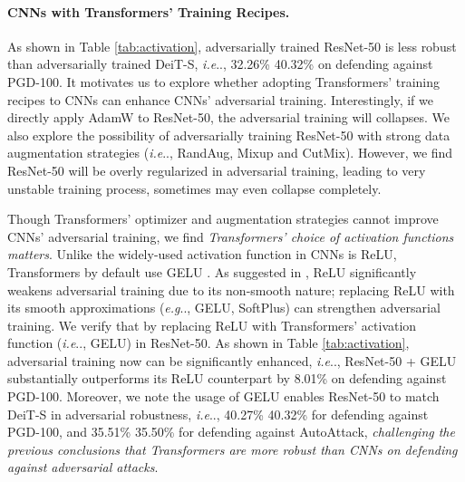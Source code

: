 \documentclass{article}
\makeatletter
\def\vs{{\bm{s}}}
\DeclareRobustCommand\onedot{\futurelet\@let@token\@onedot}
\def\@onedot{\ifx\@let@token.\else.\null\fi\xspace}
\def\eg{\emph{e.g}\onedot} \def\Eg{\emph{E.g}\onedot}
\def\ie{\emph{i.e}\onedot} \def\Ie{\emph{I.e}\onedot}
\makeatother
\begin{document}
\paragraph{CNNs with Transformers' Training Recipes.}
As shown in Table \ref{tab:activation}, adversarially trained ResNet-50 is less robust than adversarially trained DeiT-S, \ie, 32.26\% \vs 40.32\% on defending against PGD-100. It motivates us to explore whether adopting Transformers' training recipes to CNNs can enhance CNNs' adversarial training.  Interestingly, if we directly apply AdamW to ResNet-50, the adversarial training will collapses. We also explore the possibility of adversarially training ResNet-50 with strong data augmentation strategies (\ie, RandAug, Mixup and CutMix). However, we find ResNet-50 will be overly regularized in adversarial training, leading to very unstable training process, sometimes may even collapse completely.

Though Transformers' optimizer and augmentation strategies cannot improve CNNs' adversarial training, we find \emph{Transformers' choice of activation functions matters}. Unlike the widely-used activation function in CNNs is ReLU, Transformers by default use GELU \cite{hendrycks2016gaussian}. As suggested in \cite{xie2020smooth}, ReLU significantly weakens adversarial training due to its non-smooth nature; replacing ReLU with its smooth approximations (\eg, GELU, SoftPlus) can strengthen adversarial training. We verify that by replacing ReLU with Transformers' activation function (\ie, GELU) in ResNet-50. As shown in Table \ref{tab:activation}, adversarial training now can be significantly enhanced, \ie,  ResNet-50 + GELU  substantially outperforms its ReLU counterpart  by 8.01\% on defending against PGD-100. Moreover, we note the usage of GELU enables ResNet-50 to match DeiT-S in adversarial robustness, \ie, 40.27\% \vs 40.32\% for defending against PGD-100, and 35.51\% \vs 35.50\% for defending against AutoAttack, \emph{challenging the previous conclusions \cite{bhojanapalli2021understanding,shao2021adversarial}  that Transformers are more robust than CNNs on defending against adversarial attacks}. 
\end{document}
